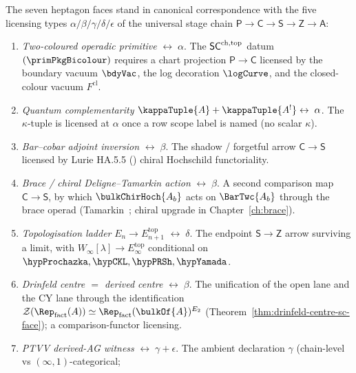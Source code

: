 \begin{remark}
\label{rem:heptagon-licensing-duality}%
%
%
%
The seven heptagon faces stand in canonical correspondence with
the five licensing types $\alpha / \beta / \gamma / \delta / \epsilon$
of the universal stage chain
$\mathsf{P} \to \mathsf{C} \to \mathsf{S} \to \mathsf{Z} \to \mathsf{A}$:
\begin{enumerate}[label=\textup{(\arabic*)}]
\item \emph{Two-coloured operadic primitive} $\leftrightarrow\;\alpha$.
The $\mathsf{SC}^{\mathrm{ch},\mathrm{top}}$ datum $(\primPkgBicolour)$ requires a chart
projection $\mathsf{P} \to \mathsf{C}$ licensed by the boundary
vacuum $\bdyVac$, the log decoration $\logCurve$, and the
closed-colour vacuum $F^{\mathrm{cl}}$.
\item \emph{Quantum complementarity}
$\kappaTuple{A} + \kappaTuple{A^!}\leftrightarrow\;\alpha$.
The $\kappa$-tuple is licensed at $\alpha$ once a row scope
label is named (no scalar $\kappa$).
\item \emph{Bar--cobar adjoint inversion} $\leftrightarrow\;\beta$.
The shadow / forgetful arrow $\mathsf{C} \to \mathsf{S}$ licensed
by Lurie HA.5.5 (\cite{LurieHA}) chiral Hochschild functoriality.
\item \emph{Brace / chiral Deligne--Tamarkin action}
$\leftrightarrow\;\beta$.
A second comparison map $\mathsf{C} \to \mathsf{S}$, by which
$\bulkChirHoch{A_b}$ acts on $\BarTwc{A_b}$ through the brace
operad (Tamarkin~\cite{Tamarkin2003}; chiral upgrade in
Chapter~\ref{ch:brace}).
\item \emph{Topologisation ladder}
$E_n \to E_{n+1}^{\mathrm{top}}$ $\leftrightarrow\;\delta$.
The endpoint $\mathsf{S} \to \mathsf{Z}$ arrow surviving a limit,
with $W_\infty[\lambda] \to E_\infty^{\mathrm{top}}$ conditional
on $\hypProchazka, \hypCKL, \hypPRSh, \hypYamada$.
\item \emph{Drinfeld centre $=$ derived centre}
$\leftrightarrow\;\beta$.
The unification of the open lane and the CY lane through the
identification
$\cZ(\Rep_{\mathrm{fact}}(A)) \simeq \Rep_{\mathrm{fact}}(\bulkOf{A})^{E_2}$
(Theorem~\ref{thm:drinfeld-centre-sc-face}); a comparison-functor
licensing.
\item \emph{PTVV derived-AG witness}
$\leftrightarrow\;\gamma + \epsilon$.
The ambient declaration $\gamma$ (chain-level vs $(\infty,1)$-categorical;

\end{enumerate}
\end{remark}
